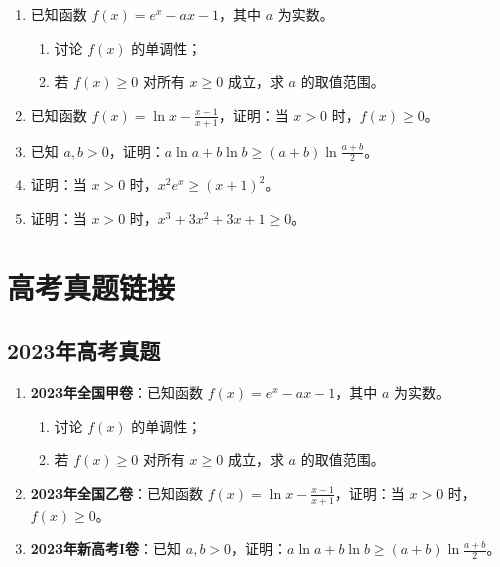 \documentclass[a4paper,11pt]{ctexrep}
\theoremstyle{definition}
\begin{document}
\begin{enumerate}
    \item 已知函数 $f(x) = e^x - ax - 1$，其中 $a$ 为实数。
    \begin{enumerate}
        \item 讨论 $f(x)$ 的单调性；
        \item 若 $f(x) \geq 0$ 对所有 $x \geq 0$ 成立，求 $a$ 的取值范围。
    \end{enumerate}
    
    \item 已知函数 $f(x) = \ln x - \frac{x-1}{x+1}$，证明：当 $x > 0$ 时，$f(x) \geq 0$。
    
    \item 已知 $a, b > 0$，证明：$a\ln a + b\ln b \geq (a+b)\ln\frac{a+b}{2}$。
    
    \item 证明：当 $x > 0$ 时，$x^2e^x \geq (x+1)^2$。
    
    \item 证明：当 $x > 0$ 时，$x^3 + 3x^2 + 3x + 1 \geq 0$。
\end{enumerate}

\section{高考真题链接}

\subsection{2023年高考真题}

\begin{enumerate}
    \item \textbf{2023年全国甲卷}：已知函数 $f(x) = e^x - ax - 1$，其中 $a$ 为实数。
    \begin{enumerate}
        \item 讨论 $f(x)$ 的单调性；
        \item 若 $f(x) \geq 0$ 对所有 $x \geq 0$ 成立，求 $a$ 的取值范围。
    \end{enumerate}
    
    \item \textbf{2023年全国乙卷}：已知函数 $f(x) = \ln x - \frac{x-1}{x+1}$，证明：当 $x > 0$ 时，$f(x) \geq 0$。
    
    \item \textbf{2023年新高考I卷}：已知 $a, b > 0$，证明：$a\ln a + b\ln b \geq (a+b)\ln\frac{a+b}{2}$。
\end{enumerate}
\end{document}
